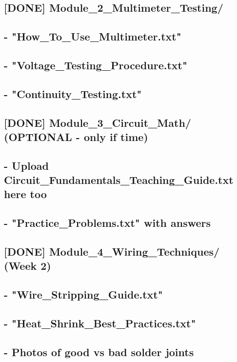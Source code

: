 \documentclass[11pt,letterpaper]{article}
\begin{document}
\subsection*{[DONE] Module\_2\_Multimeter\_Testing/}

\subsection*{- "How\_To\_Use\_Multimeter.txt"}

\subsection*{- "Voltage\_Testing\_Procedure.txt"}

\subsection*{- "Continuity\_Testing.txt"}

\subsection*{[DONE] Module\_3\_Circuit\_Math/ (OPTIONAL - only if time)}

\subsection*{- Upload Circuit\_Fundamentals\_Teaching\_Guide.txt here too}

\subsection*{- "Practice\_Problems.txt" with answers}

\subsection*{[DONE] Module\_4\_Wiring\_Techniques/ (Week 2)}

\subsection*{- "Wire\_Stripping\_Guide.txt"}

\subsection*{- "Heat\_Shrink\_Best\_Practices.txt"}

\subsection*{- Photos of good vs bad solder joints}
\end{document}

